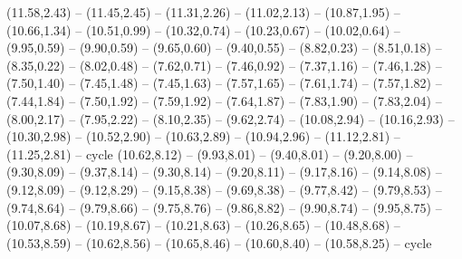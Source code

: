 \expandafter\def\csname geo:gebiet:1938-Hungary\endcsname{
  (11.58,2.43) -- (11.45,2.45) -- (11.31,2.26) -- (11.02,2.13) -- (10.87,1.95) -- (10.66,1.34) -- (10.51,0.99) -- (10.32,0.74) -- (10.23,0.67) -- (10.02,0.64) -- (9.95,0.59) -- (9.90,0.59) -- (9.65,0.60) -- (9.40,0.55) -- (8.82,0.23) -- (8.51,0.18) -- (8.35,0.22) -- (8.02,0.48) -- (7.62,0.71) -- (7.46,0.92) -- (7.37,1.16) -- (7.46,1.28) -- (7.50,1.40) -- (7.45,1.48) -- (7.45,1.63) -- (7.57,1.65) -- (7.61,1.74) -- (7.57,1.82) -- (7.44,1.84) -- (7.50,1.92) -- (7.59,1.92) -- (7.64,1.87) -- (7.83,1.90) -- (7.83,2.04) -- (8.00,2.17) -- (7.95,2.22) -- (8.10,2.35) -- (9.62,2.74) -- (10.08,2.94) -- (10.16,2.93) -- (10.30,2.98) -- (10.52,2.90) -- (10.63,2.89) -- (10.94,2.96) -- (11.12,2.81) -- (11.25,2.81) -- cycle}
\expandafter\def\csname geo:gebiet:1938-Reich\endcsname{
  (10.62,8.12) -- (9.93,8.01) -- (9.40,8.01) -- (9.20,8.00) -- (9.30,8.09) -- (9.37,8.14) -- (9.30,8.14) -- (9.20,8.11) -- (9.17,8.16) -- (9.14,8.08) -- (9.12,8.09) -- (9.12,8.29) -- (9.15,8.38) -- (9.69,8.38) -- (9.77,8.42) -- (9.79,8.53) -- (9.74,8.64) -- (9.79,8.66) -- (9.75,8.76) -- (9.86,8.82) -- (9.90,8.74) -- (9.95,8.75) -- (10.07,8.68) -- (10.19,8.67) -- (10.21,8.63) -- (10.26,8.65) -- (10.48,8.68) -- (10.53,8.59) -- (10.62,8.56) -- (10.65,8.46) -- (10.60,8.40) -- (10.58,8.25) -- cycle
}
